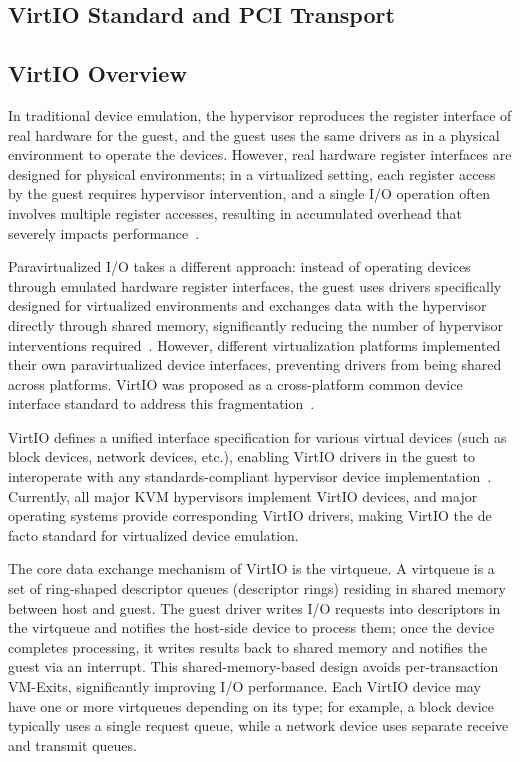 \begin{ZhChapter}
\section{VirtIO Standard and PCI Transport}
\label{sec:virtio-pci}

\subsection{VirtIO Overview}
\label{sec:virtio-overview}

In traditional device emulation, the hypervisor reproduces the register interface of real hardware for the guest, and the guest uses the same drivers as in a physical environment to operate the devices. However, real hardware register interfaces are designed for physical environments; in a virtualized setting, each register access by the guest requires hypervisor intervention, and a single I/O operation often involves multiple register accesses, resulting in accumulated overhead that severely impacts performance~\cite{Russell2008}.

Paravirtualized I/O takes a different approach: instead of operating devices through emulated hardware register interfaces, the guest uses drivers specifically designed for virtualized environments and exchanges data with the hypervisor directly through shared memory, significantly reducing the number of hypervisor interventions required~\cite{Russell2008}. However, different virtualization platforms implemented their own paravirtualized device interfaces, preventing drivers from being shared across platforms. VirtIO was proposed as a cross-platform common device interface standard to address this fragmentation~\cite{Russell2008}.

VirtIO defines a unified interface specification for various virtual devices (such as block devices, network devices, etc.), enabling VirtIO drivers in the guest to interoperate with any standards-compliant hypervisor device implementation~\cite{VirtIO11}. Currently, all major KVM hypervisors implement VirtIO devices, and major operating systems provide corresponding VirtIO drivers, making VirtIO the de facto standard for virtualized device emulation.

The core data exchange mechanism of VirtIO is the virtqueue. A virtqueue is a set of ring-shaped descriptor queues (descriptor rings) residing in shared memory between host and guest. The guest driver writes I/O requests into descriptors in the virtqueue and notifies the host-side device to process them; once the device completes processing, it writes results back to shared memory and notifies the guest via an interrupt. This shared-memory-based design avoids per-transaction VM-Exits, significantly improving I/O performance. Each VirtIO device may have one or more virtqueues depending on its type; for example, a block device typically uses a single request queue, while a network device uses separate receive and transmit queues.


\end{ZhChapter}
